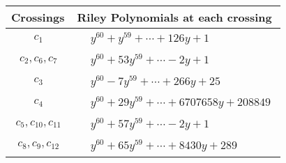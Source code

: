 \documentclass[1p]{elsarticle_modified}
\theoremstyle{definition}
\begin{document}
\begin{tabular}{m{50pt}|m{274pt}}
Crossings & \hspace{64pt}Riley Polynomials at each crossing \\
\hline $$\begin{aligned}c_{1}\end{aligned}$$&$\begin{aligned}
&y^{60}+y^{59}+\cdots+126 y+1
\end{aligned}$\\
\hline $$\begin{aligned}c_{2},c_{6},c_{7}\end{aligned}$$&$\begin{aligned}
&y^{60}+53 y^{59}+\cdots-2 y+1
\end{aligned}$\\
\hline $$\begin{aligned}c_{3}\end{aligned}$$&$\begin{aligned}
&y^{60}-7 y^{59}+\cdots+266 y+25
\end{aligned}$\\
\hline $$\begin{aligned}c_{4}\end{aligned}$$&$\begin{aligned}
&y^{60}+29 y^{59}+\cdots+6707658 y+208849
\end{aligned}$\\
\hline $$\begin{aligned}c_{5},c_{10},c_{11}\end{aligned}$$&$\begin{aligned}
&y^{60}+57 y^{59}+\cdots-2 y+1
\end{aligned}$\\
\hline $$\begin{aligned}c_{8},c_{9},c_{12}\end{aligned}$$&$\begin{aligned}
&y^{60}+65 y^{59}+\cdots+8430 y+289
\end{aligned}$\\
\hline
\end{tabular}
\vskip 2pc
\end{document}
